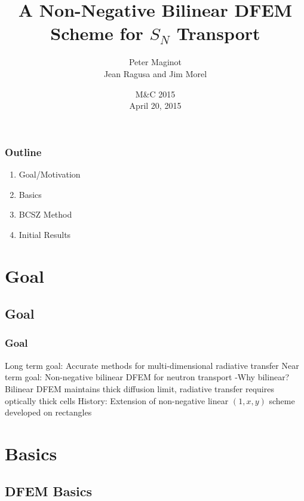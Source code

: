 \documentclass{beamer}
\title{A Non-Negative Bilinear DFEM Scheme for $S_N$ Transport}
\author{Peter Maginot \\ Jean Ragusa and Jim Morel}\institute{Texas A\&M University- Department of Nuclear Engineering}
\date{M\&C 2015 \\ April 20, 2015 }
\newif\ifplacelogo %
\begin{document}
\placelogotrue
\begin{frame}
\titlepage


\end{frame}


\placelogofalse

\begin{frame}
\frametitle{Outline}

\begin{enumerate}
\item Goal/Motivation
\item Basics
\item BCSZ Method
\item Initial Results
\end{enumerate}

\end{frame}


\section{Goal}

\subsection{Goal}
\begin{frame}
\frametitle{Goal}
Long term goal: Accurate methods for multi-dimensional radiative transfer
Near term goal: Non-negative bilinear DFEM for neutron transport
-Why bilinear? Bilinear DFEM maintains thick diffusion limit, radiative transfer requires optically thick cells
History: Extension of non-negative linear $(1,x,y)$ scheme developed on rectangles
\end{frame}


\section{Basics}

\subsection{DFEM Basics}
\end{document}
